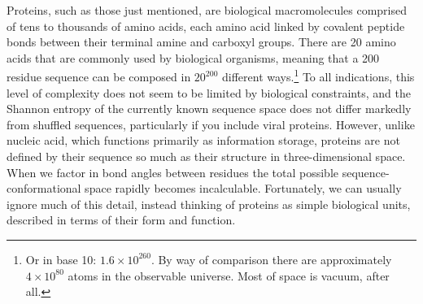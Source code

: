 \documentclass[a4paper,11pt,twoside,openright]{scrbook}
\begin{document}

Proteins, such as those just mentioned, are biological macromolecules comprised of tens to thousands of amino acids, each amino acid linked by covalent peptide bonds between their terminal amine and carboxyl groups. There are 20 amino acids that are commonly used by biological organisms, meaning that a 200 residue sequence can be composed in \(20^{200}\) different ways.\footnote{Or in base 10: \(1.6\times10^{260}\). By way of comparison there are approximately \(4\times10^{80}\) atoms in the observable universe. Most of space is vacuum, after all.} To all indications, this level of complexity does not seem to be limited by biological constraints, and the Shannon entropy of the currently known sequence space does not differ markedly from shuffled sequences, particularly if you include viral proteins. However, unlike nucleic acid, which functions primarily as information storage, proteins are not defined by their sequence so much as their structure in three-dimensional space. When we factor in bond angles between residues the total possible sequence-conformational space rapidly becomes incalculable. Fortunately, we can usually ignore much of this detail, instead thinking of proteins as simple biological units, described in terms of their form and function.
\end{document}
